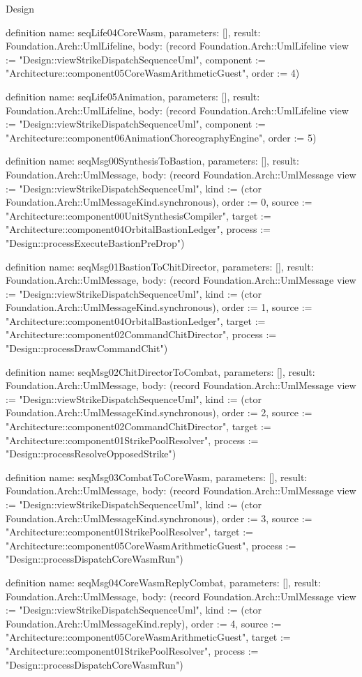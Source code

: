 \begin{lexlean}{Design}
\begin{semanticmodule}
definition{
  name: seqLife04CoreWasm,
  parameters: [],
  result: Foundation.Arch::UmlLifeline,
  body: (record Foundation.Arch::UmlLifeline {view := "Design::viewStrikeDispatchSequenceUml", component := "Architecture::component05CoreWasmArithmeticGuest", order := 4})
}

definition{
  name: seqLife05Animation,
  parameters: [],
  result: Foundation.Arch::UmlLifeline,
  body: (record Foundation.Arch::UmlLifeline {view := "Design::viewStrikeDispatchSequenceUml", component := "Architecture::component06AnimationChoreographyEngine", order := 5})
}

definition{
  name: seqMsg00SynthesisToBastion,
  parameters: [],
  result: Foundation.Arch::UmlMessage,
  body: (record Foundation.Arch::UmlMessage {view := "Design::viewStrikeDispatchSequenceUml", kind := (ctor Foundation.Arch::UmlMessageKind.synchronous), order := 0, source := "Architecture::component00UnitSynthesisCompiler", target := "Architecture::component04OrbitalBastionLedger", process := "Design::processExecuteBastionPreDrop"})
}

definition{
  name: seqMsg01BastionToChitDirector,
  parameters: [],
  result: Foundation.Arch::UmlMessage,
  body: (record Foundation.Arch::UmlMessage {view := "Design::viewStrikeDispatchSequenceUml", kind := (ctor Foundation.Arch::UmlMessageKind.synchronous), order := 1, source := "Architecture::component04OrbitalBastionLedger", target := "Architecture::component02CommandChitDirector", process := "Design::processDrawCommandChit"})
}

definition{
  name: seqMsg02ChitDirectorToCombat,
  parameters: [],
  result: Foundation.Arch::UmlMessage,
  body: (record Foundation.Arch::UmlMessage {view := "Design::viewStrikeDispatchSequenceUml", kind := (ctor Foundation.Arch::UmlMessageKind.synchronous), order := 2, source := "Architecture::component02CommandChitDirector", target := "Architecture::component01StrikePoolResolver", process := "Design::processResolveOpposedStrike"})
}

definition{
  name: seqMsg03CombatToCoreWasm,
  parameters: [],
  result: Foundation.Arch::UmlMessage,
  body: (record Foundation.Arch::UmlMessage {view := "Design::viewStrikeDispatchSequenceUml", kind := (ctor Foundation.Arch::UmlMessageKind.synchronous), order := 3, source := "Architecture::component01StrikePoolResolver", target := "Architecture::component05CoreWasmArithmeticGuest", process := "Design::processDispatchCoreWasmRun"})
}

definition{
  name: seqMsg04CoreWasmReplyCombat,
  parameters: [],
  result: Foundation.Arch::UmlMessage,
  body: (record Foundation.Arch::UmlMessage {view := "Design::viewStrikeDispatchSequenceUml", kind := (ctor Foundation.Arch::UmlMessageKind.reply), order := 4, source := "Architecture::component05CoreWasmArithmeticGuest", target := "Architecture::component01StrikePoolResolver", process := "Design::processDispatchCoreWasmRun"})
}


\end{semanticmodule}
\end{lexlean}
